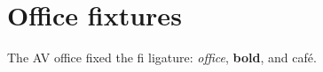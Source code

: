 \documentclass{article}
\begin{document}
\section{Office fixtures}
The AV office fixed the fi ligature: \emph{office}, \textbf{bold}, and caf\'e.
\end{document}
